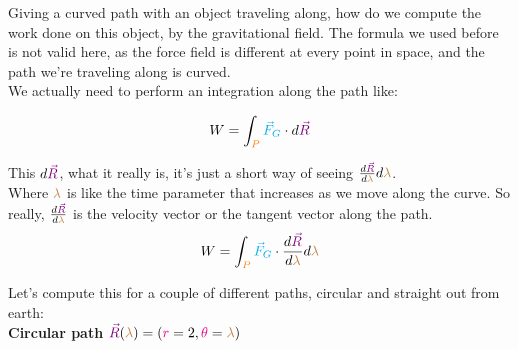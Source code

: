 Giving a curved path with an object traveling along, how do we compute the work done on this object, by
the gravitational field. The formula we used before is not valid here, as the force field 
is different at every point in space, and the path we're traveling along is curved.\\

We actually need to perform an integration along the path like:

\begin{equation}
    W = \int_{\begingroup\color{orange}P\endgroup} \begingroup\color{cyan}\vec{F}_G\endgroup \cdot d\begingroup\color{violet}\vec{R}\endgroup
\end{equation}

This $d\begingroup\color{violet}\vec{R}\endgroup$, what it really is, it's just a short way of seeing $\frac{d\begingroup\color{violet}\vec{R}\endgroup}{d\begingroup\color{brown}\lambda\endgroup} d\begingroup\color{brown}\lambda\endgroup$.\\
Where $\begingroup\color{brown}\lambda\endgroup$ is like the time parameter that increases as we move along the curve.
So really, $\frac{d\begingroup\color{violet}\vec{R}\endgroup}{d\begingroup\color{brown}\lambda\endgroup}$ is the velocity vector or the tangent vector along the path.\\

\begin{equation}
    W = \int_{\begingroup\color{orange}P\endgroup} \begingroup\color{cyan}\vec{F}_G\endgroup \cdot \frac{d\begingroup\color{violet}\vec{R}\endgroup}{d\begingroup\color{brown}\lambda\endgroup} d\begingroup\color{brown}\lambda\endgroup
\end{equation}

Let's compute this for a couple of different paths, circular and straight out from earth:\\

\textbf{Circular path} $\begingroup\color{violet}\vec{R}\endgroup(\begingroup\color{brown}\lambda\endgroup) = (\begingroup\color{magenta}r\endgroup = 2, \begingroup\color{magenta}\theta\endgroup = \begingroup\color{brown}\lambda\endgroup)$

